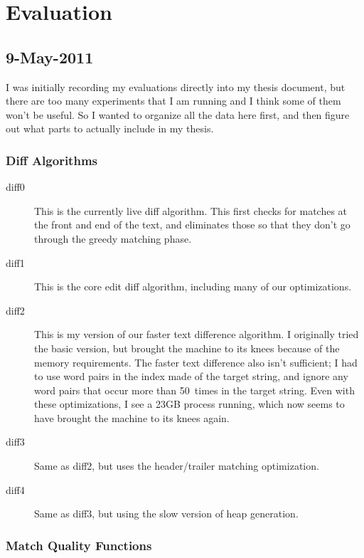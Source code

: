 \section{Evaluation}

\subsection{9-May-2011}

I was initially recording my evaluations directly into my thesis
document, but there are too many experiments that I am running
and I think some of them won't be useful.
So I wanted to organize all the data here first, and then
figure out what parts to actually include in my thesis.

\subsubsection{Diff Algorithms}

\begin{description}
\item[diff0] This is the currently live diff algorithm.
	This first checks for matches at the front and end of
	the text, and eliminates those so that they don't go
	through the greedy matching phase.
\item[diff1] This is the core edit diff algorithm, including
	many of our optimizations.
\item[diff2] This is my version of our faster text difference algorithm.
    I originally tried the basic version, but brought the machine to
    its knees because of the memory requirements.
    The faster text difference also isn't sufficient; I had to
    use word pairs in the index made of the target string,
    and ignore any word pairs that occur more than 50~times
    in the target string.  Even with these optimizations, I
    see a 23GB process running, which now seems to have brought
    the machine to its knees again.
\item[diff3] Same as diff2, but uses the header/trailer matching
    optimization.
\item[diff4] Same as diff3, but using the slow version of heap
    generation.
\end{description}

\subsubsection{Match Quality Functions}

